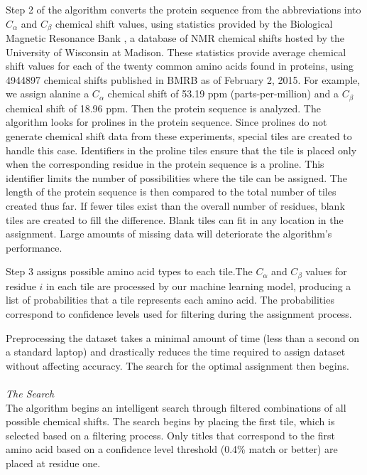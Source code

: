 \documentclass{article}
\begin{document}
Step 2 of the algorithm converts the protein sequence from the abbreviations into $C_\alpha$ and $C_\beta$ chemical shift values, using statistics provided by the Biological Magnetic Resonance Bank \cite{biomagresbank}, a database of NMR chemical shifts hosted by the University of Wisconsin at Madison. These statistics provide average chemical shift values for each of the twenty common amino acids found in proteins, using 4944897 chemical shifts published in BMRB as of February 2, 2015. For example, we assign alanine a $C_\alpha$ chemical shift of 53.19 ppm (parts-per-million) and a $C_\beta$ chemical shift of 18.96 ppm. Then the protein sequence is analyzed. The algorithm looks for prolines in the protein sequence. Since prolines do not generate chemical shift data from these experiments, special tiles are created to handle this case. Identifiers in the proline tiles ensure that the tile is placed only when the corresponding residue in the protein sequence is a proline. This identifier limits the number of possibilities where the tile can be assigned. The length of the protein sequence is then compared to the total number of tiles created thus far. If fewer tiles exist than the overall number of residues, blank tiles are created to fill the difference. Blank tiles can fit in any location in the assignment. Large amounts of missing data will deteriorate the algorithm’s performance.

Step 3 assigns possible amino acid types to each tile.The $C_\alpha$ and $C_\beta$ values for residue $i$ in each tile are processed by our machine learning model, producing a list of probabilities that a tile represents each amino acid. The probabilities correspond to confidence levels used for filtering during the assignment process. 


Preprocessing the dataset takes a minimal amount of time (less than a second on a standard laptop) and drastically reduces the time required to assign dataset without affecting accuracy. The search for the optimal assignment then begins. 
\\\\
\noindent\textit{The Search}\\
The algorithm begins an intelligent search through filtered combinations of all possible chemical shifts. The search begins by placing the first tile, which is selected based on a filtering process. Only titles that correspond to the first amino acid based on a confidence level threshold (0.4\% match or better) are placed at residue one. 
\end{document}
